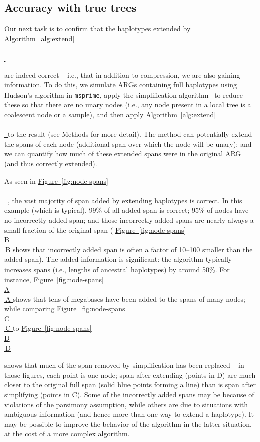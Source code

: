 \documentclass[10pt,twoside,lineno]{gsajnl}
\newcommand{\msprime}{\texttt{msprime}}
\newcommand{\algorithmref}[2][]{%
	\hyperref[{#2}]{%
		Algorithm~\ref*{#2}%
		\ifx\\#1\\%
		\else
		\,#1%
		\fi
	}%
}
\newcommand*{\figref}[2][]{%
	\hyperref[{#2}]{%
		Figure~\ref*{#2}%
		\ifx\\#1\\%
		\else
		\,#1%
		\fi
	}%
}
\begin{document}
\subsection{Accuracy with true trees}


Our next task is to confirm that the haplotypes extended by \algorithmref{alg:extend}
are indeed correct -- i.e., that in addition to compression, we are also gaining information.
To do this, 
we simulate ARGs containing full haplotypes using Hudson's algorithm in \msprime{},
apply the simplification algorithm~\citep{kelleher2018efficient,wong2024general}
to reduce these so that there are no unary nodes
(i.e., any node present in a local tree is a coalescent node or a sample),
and then apply \algorithmref{alg:extend} to the result
(see Methods for more detail).
The method can potentially extend the spans of each node
(additional span over which the node will be unary);
and we can quantify how much of these extended spans were in the original ARG
(and thus correctly extended).

%
%

As seen in \figref{fig:node-spans},
the vast majority of span added by extending haplotypes is correct.
In this example (which is typical),
99\% of all added span is correct;
95\% of nodes have no incorrectly added span; 
and those incorrectly added spans are nearly always a small fraction of the original span
(\figref[B]{fig:node-spans} shows that incorrectly added span is often a factor of
10--100 smaller than the added span).
The added information is significant:
the algorithm typically increases spans (i.e., lengths of ancestral haplotypes)
by around 50\%.
For instance, \figref[A]{fig:node-spans} 
shows that tens of megabases have been added to the spans of many nodes;
while comparing \figref[C]{fig:node-spans} to \figref[D]{fig:node-spans} 
shows that much of the span removed by simplification has been replaced --
in those figures, each point is one node;
span after extending (points in D) are much closer to the original full span
(solid blue points forming a line)
than is span after simplifying (points in C).
Some of the incorrectly added spans may be because of violations of the parsimony assumption,
while others are due to situations with ambiguous information
(and hence more than one way to extend a haplotype).
It may be possible to improve the behavior of the algorithm in the latter situation,
at the cost of a more complex algorithm. 
\end{document}
